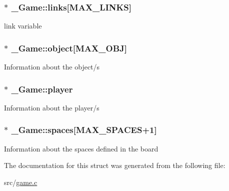 \subsubsection[{\texorpdfstring{links}{links}}]{$\ast$ \+\_\+\+Game\+::links\mbox{[}{\bf M\+A\+X\+\_\+\+L\+I\+N\+KS}\mbox{]}}\hypertarget{struct__Game_a2b766f0814f66dcf437600a9c526142e}{}\label{struct__Game_a2b766f0814f66dcf437600a9c526142e}
link variable 
\subsubsection[{\texorpdfstring{object}{object}}]{$\ast$ \+\_\+\+Game\+::object\mbox{[}{\bf M\+A\+X\+\_\+\+O\+BJ}\mbox{]}}\hypertarget{struct__Game_a805ef4ca82198bff524ed40d8ae867e7}{}\label{struct__Game_a805ef4ca82198bff524ed40d8ae867e7}
Information about the object/s 
\subsubsection[{\texorpdfstring{player}{player}}]{$\ast$ \+\_\+\+Game\+::player}\hypertarget{struct__Game_a31406605782d71ec00c4bf258ea76267}{}\label{struct__Game_a31406605782d71ec00c4bf258ea76267}
Information about the player/s 
\subsubsection[{\texorpdfstring{spaces}{spaces}}]{$\ast$ \+\_\+\+Game\+::spaces\mbox{[}{\bf M\+A\+X\+\_\+\+S\+P\+A\+C\+ES}+1\mbox{]}}\hypertarget{struct__Game_ab4180417d9148f8abb2233ca6c4ecfe5}{}\label{struct__Game_ab4180417d9148f8abb2233ca6c4ecfe5}
Information about the spaces defined in the board 

The documentation for this struct was generated from the following file\+:\begin{DoxyCompactItemize}
\item 
src/\hyperlink{game_8c}{game.\+c}\end{DoxyCompactItemize}
